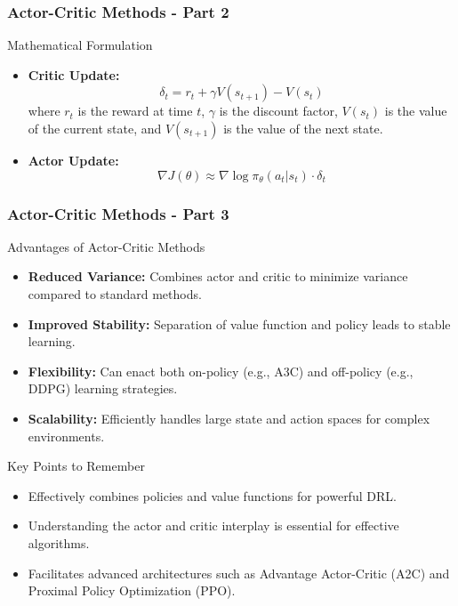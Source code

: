 \documentclass[aspectratio=169]{beamer}
\begin{document}
\begin{frame}[fragile]
    \frametitle{Actor-Critic Methods - Part 2}
    \begin{block}{Mathematical Formulation}
        \begin{itemize}
            \item \textbf{Critic Update:} 
            \begin{equation}
                \delta_t = r_t + \gamma V(s_{t+1}) - V(s_t)
            \end{equation}
            where $r_t$ is the reward at time $t$, $\gamma$ is the discount factor, $V(s_t)$ is the value of the current state, and $V(s_{t+1})$ is the value of the next state.
        
            \item \textbf{Actor Update:} 
            \begin{equation}
                \nabla J(\theta) \approx \nabla \log \pi_\theta(a_t | s_t) \cdot \delta_t
            \end{equation}
        \end{itemize}
    \end{block}
\end{frame}

\begin{frame}[fragile]
    \frametitle{Actor-Critic Methods - Part 3}
    \begin{block}{Advantages of Actor-Critic Methods}
        \begin{itemize}
            \item \textbf{Reduced Variance:} Combines actor and critic to minimize variance compared to standard methods.
            \item \textbf{Improved Stability:} Separation of value function and policy leads to stable learning.
            \item \textbf{Flexibility:} Can enact both on-policy (e.g., A3C) and off-policy (e.g., DDPG) learning strategies.
            \item \textbf{Scalability:} Efficiently handles large state and action spaces for complex environments.
        \end{itemize}
    \end{block}
    
    \begin{block}{Key Points to Remember}
        \begin{itemize}
            \item Effectively combines policies and value functions for powerful DRL.
            \item Understanding the actor and critic interplay is essential for effective algorithms.
            \item Facilitates advanced architectures such as Advantage Actor-Critic (A2C) and Proximal Policy Optimization (PPO).
        \end{itemize}
    \end{block}
\end{frame}
\end{document}
